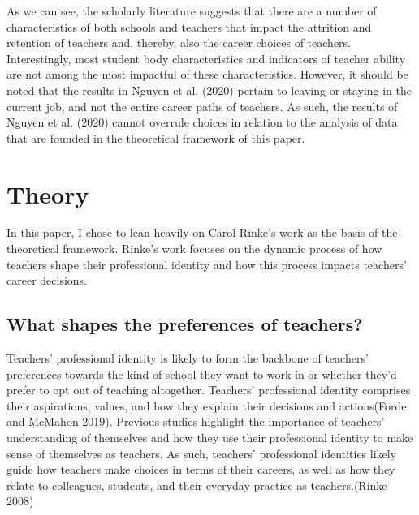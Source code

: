 \documentclass[
]{article}
\begin{document}
As we can see, the scholarly literature suggests that there are a number of characteristics of both schools and teachers that impact the attrition and retention of teachers and, thereby, also the career choices of teachers. Interestingly, most student body characteristics and indicators of teacher ability are not among the most impactful of these characteristics. However, it should be noted that the results in Nguyen et al. (2020) pertain to leaving or staying in the current job, and not the entire career paths of teachers. As such, the results of Nguyen et al. (2020) cannot overrule choices in relation to the analysis of data that are founded in the theoretical framework of this paper.

\hypertarget{theory}{%
\section{Theory}\label{theory}}

In this paper, I chose to lean heavily on Carol Rinke's work as the basis of the theoretical framework. Rinke's work focuses on the dynamic process of how teachers shape their professional identity and how this process impacts teachers' career decisions.

\hypertarget{what-shapes-the-preferences-of-teachers}{%
\subsection{What shapes the preferences of teachers?}\label{what-shapes-the-preferences-of-teachers}}

Teachers' professional identity is likely to form the backbone of teachers' preferences towards the kind of school they want to work in or whether they'd prefer to opt out of teaching altogether. Teachers' professional identity comprises their aspirations, values, and how they explain their decisions and actions(Forde and McMahon 2019). Previous studies highlight the importance of teachers' understanding of themselves and how they use their professional identity to make sense of themselves as teachers. As such, teachers' professional identities likely guide how teachers make choices in terms of their careers, as well as how they relate to colleagues, students, and their everyday practice as teachers.(Rinke 2008)
\end{document}
